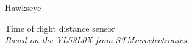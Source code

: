 {\raggedleft 
{}
}\hfill
{\raggedright  \huge Hawkseye}
\begin{center}
 {\huge{Time of flight distance sensor}}\\
 {\large\textit{Based on the VL53L0X from STMicroelectronics}}
\end{center}
\hrulefill
\par{}

